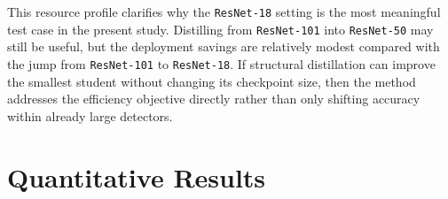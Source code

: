 This resource profile clarifies why the \texttt{ResNet-18} setting is the most meaningful test case in the present study. Distilling from \texttt{ResNet-101} into \texttt{ResNet-50} may still be useful, but the deployment savings are relatively modest compared with the jump from \texttt{ResNet-101} to \texttt{ResNet-18}. If structural distillation can improve the smallest student without changing its checkpoint size, then the method addresses the efficiency objective directly rather than only shifting accuracy within already large detectors.

\section{Quantitative Results}

\begin{table}[t]
\centering
\small
{}
\caption{Final COCO validation metrics extracted from the recorded experiment outputs in the repository. All scores are for the student branch evaluated on $5000$ validation images. Both successful \texttt{ResNet-101}-teacher runs improve over their matching student-only baselines, while the proposed compact model, \texttt{ResNet-101} $\rightarrow$ \texttt{ResNet-18} KD, remains the most important efficiency-oriented result because it improves the smallest deployment target without increasing its student checkpoint size.}
\label{tab:main-results}
\end{table}

